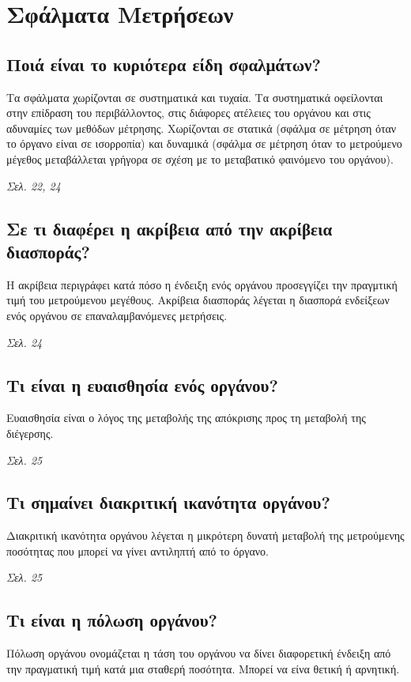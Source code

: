 \documentclass{article}
\begin{document}
\section{Σφάλματα Μετρήσεων}

\subsection{Ποιά είναι το κυριότερα είδη σφαλμάτων?}
Τα σφάλματα χωρίζονται σε συστηματικά και τυχαία. Τα συστηματικά οφείλονται στην επίδραση του περιβάλλοντος, στις διάφορες ατέλειες
του οργάνου και στις αδυναμίες των μεθόδων μέτρησης. Χωρίζονται σε στατικά (σφάλμα σε μέτρηση όταν το όργανο είναι σε ισορροπία) και δυναμικά (σφάλμα σε μέτρηση όταν το
μετρούμενο μέγεθος μεταβάλλεται γρήγορα σε σχέση με το μεταβατικό φαινόμενο του οργάνου).

\emph{Σελ. 22, 24}

\subsection{Σε τι διαφέρει η ακρίβεια από την ακρίβεια διασποράς?}
Η ακρίβεια περιγράφει κατά πόσο η ένδειξη ενός οργάνου προσεγγίζει την πραγμτική τιμή του μετρούμενου μεγέθους. Ακρίβεια διασποράς λέγεται η διασπορά ενδείξεων ενός 
οργάνου σε επαναλαμβανόμενες μετρήσεις.

\emph{Σελ. 24}

\subsection{Τι είναι η ευαισθησία ενός οργάνου?}
Ευαισθησία είναι ο λόγος της μεταβολής της απόκρισης προς τη μεταβολή της διέγερσης.

\emph{Σελ. 25}

\subsection{Τι σημαίνει διακριτική ικανότητα οργάνου?}
Διακριτική ικανότητα οργάνου λέγεται η μικρότερη δυνατή μεταβολή της μετρούμενης ποσότητας που μπορεί να γίνει αντιληπτή από το όργανο.

\emph{Σελ. 25}
\subsection{Τι είναι η πόλωση οργάνου?}
Πόλωση οργάνου ονομάζεται η τάση του οργάνου να δίνει διαφορετική ένδειξη από την πραγματική τιμή κατά μια σταθερή ποσότητα. Μπορεί να είνα θετική ή αρνητική.
\end{document}
